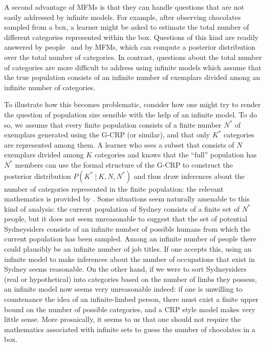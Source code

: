 \documentclass[doc]{apa6}
\newcommand{\given}{\ | \ }
\begin{document}
A second advantage of MFMs is that they can handle questions that are not easily addressed by infinite models. For example, after observing chocolates sampled from a box, a learner might be asked to estimate the total number of different categories represented within the box. Questions of this kind are readily answered by people~\cite{kemp_object_2009,navarro_finding_2013} and by MFMs, which can compute a posterior distribution over the total number of categories.  In contrast, questions about the total number of categories are more difficult to address using infinite models which assume that the true population consists of an infinite number of exemplars divided among an infinite number of categories.

To illustrate how this becomes problematic, consider how one might try to render the question of population size sensible with the help of an infinite model. To do so, we assume that every finite population consists of a finite number $N^*$ of exemplars generated using the G-CRP (or similar), and that only $K^*$ categories are represented among them. A learner who sees a subset that consists of $N$ exemplars divided among $K$ categories and knows that the ``full'' population has $N^*$ members can use the formal structure of the G-CRP to construct the posterior distribution $P(K^* \given K,N,N^*)$ and thus draw inferences about the number of categories represented in the finite population: the relevant mathematics is provided by . Some situations seem naturally amenable to this kind of analysis: the current population of Sydney consists of a finite set of $N^*$ people, but it does not seem unreasonable to suggest that the set of potential Sydneysiders consists of an infinite number of possible humans from which the current population has been sampled. Among an infinite number of people there could plausibly be an infinite number of job titles. If one accepts this, using an infinite model to make inferences about the number of occupations that exist in Sydney seems reasonable. On the other hand, if we were to sort Sydneysiders (real or hypothetical) into categories based on the number of limbs they possess, an infinite model now seems very unreasonable indeed: if one is unwilling to countenance the idea of an infinite-limbed person, there must exist a finite upper bound on the number of possible categories, and a CRP style model makes very little sense. More prosaically, it seems to us that one should not require the mathematics associated with infinite sets to guess the number of chocolates in a box.
\end{document}
